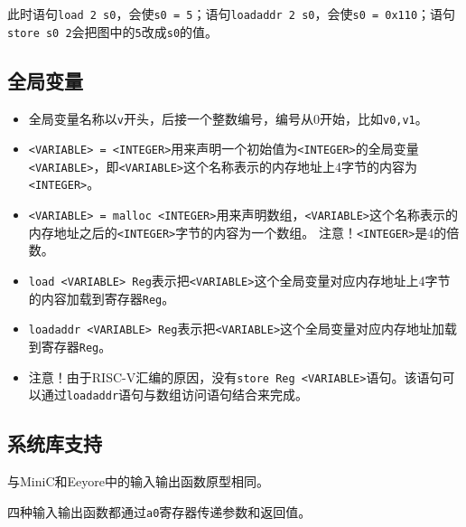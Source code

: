 \documentclass{ctexart}
\begin{document}
此时语句\texttt{load 2 s0}，会使\texttt{s0 = 5}；语句\texttt{loadaddr 2 s0}，会使\texttt{s0 = 0x110}；语句\texttt{store s0 2}会把图中的\texttt{5}改成\texttt{s0}的值。

\subsection{全局变量}

\begin{itemize}
\item
全局变量名称以\texttt{v}开头，后接一个整数编号，编号从0开始，比如\texttt{v0,v1}。

\item
\texttt{<VARIABLE> = <INTEGER>}用来声明一个初始值为\texttt{<INTEGER>}的全局变量\texttt{<VARIABLE>}，即\texttt{<VARIABLE>}这个名称表示的内存地址上4字节的内容为\texttt{<INTEGER>}。

\item
\texttt{<VARIABLE> = malloc <INTEGER>}用来声明数组，\texttt{<VARIABLE>}这个名称表示的内存地址之后的\texttt{<INTEGER>}字节的内容为一个数组。
注意！\texttt{<INTEGER>}是4的倍数。


\item
\texttt{load <VARIABLE> Reg}表示把\texttt{<VARIABLE>}这个全局变量对应内存地址上4字节的内容加载到寄存器\texttt{Reg}。

\item
\texttt{loadaddr <VARIABLE> Reg}表示把\texttt{<VARIABLE>}这个全局变量对应内存地址加载到寄存器\texttt{Reg}。

\item
注意！由于RISC-V汇编的原因，没有\texttt{store Reg <VARIABLE>}语句。该语句可以通过\texttt{loadaddr}语句与数组访问语句结合来完成。
\end{itemize}

\subsection{系统库支持}
与MiniC和Eeyore中的输入输出函数原型相同。

四种输入输出函数都通过\texttt{a0}寄存器传递参数和返回值。

\newpage
\end{document}
